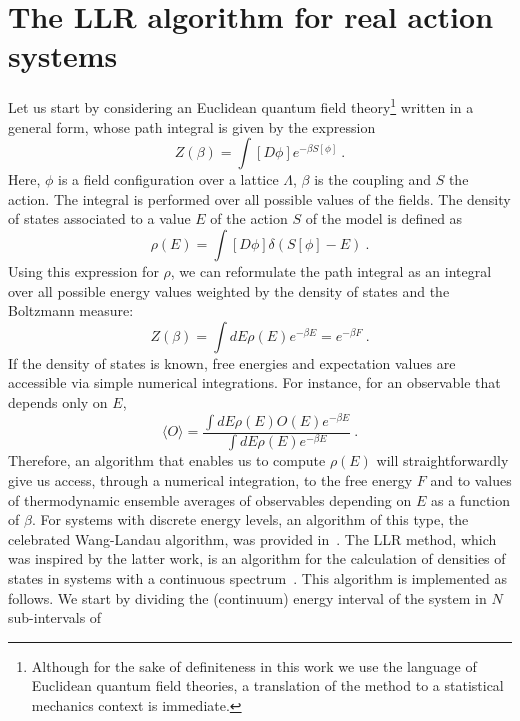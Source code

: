\documentclass[a4paper]{jpconf}
\begin{document}
\section{The LLR algorithm for real action systems}
\label{sect:real}
Let us start by considering an Euclidean quantum field
theory\footnote{Although for the sake of definiteness in this work we
  use the language of Euclidean quantum field theories, a translation
  of the method to a statistical mechanics context is immediate.} written in a general
form, whose path integral is given by the expression
\begin{equation}
Z(\beta)=\int [ D \phi ] e^{-\beta S [ \phi ]} \ .
\end{equation}
Here, $\phi$ is a field configuration over a lattice $\Lambda$,
$\beta$ is the coupling and $S$ the action. The integral is performed
over all possible values of the fields.  The density of states
associated to a value $E$ of the action $S$ of the model is defined as
\begin{equation}
\rho(E)=\int [ D \phi ] \delta(S[\phi]-E) \ .
\end{equation}
Using this expression for $\rho$, we can reformulate the path integral
as an integral over all possible energy values weighted by the density
of states and the Boltzmann measure:
\begin{equation}
Z(\beta)=\int d E \rho(E) e^{-\beta E}= e^{- \beta F} \ .
\end{equation}
If the density of states is known, free energies and expectation
values are accessible via simple numerical integrations. For instance,
for an observable that depends only on $E$, 
\begin{equation}
 \langle O \rangle=\frac{\int dE \rho(E) O(E) e^{-\beta E}}{\int dE
   \rho(E) e^{-\beta E}} \ . 
\end{equation}
Therefore, an algorithm that enables us to compute $\rho(E)$ will
straightforwardly give us access, through a numerical integration, to
the free energy $F$ and to values of thermodynamic ensemble averages of
observables depending on $E$ as a function of $\beta$. For systems
with discrete energy levels, an algorithm of this type, the celebrated
Wang-Landau algorithm, was provided
in~\cite{Wang:2000fzi}. The LLR method, which was inspired by the latter work,
is an algorithm for the calculation of densities of states in systems
with a continuous
spectrum~\cite{Langfeld:2012ah,Langfeld:2015fua}. This algorithm is
implemented as follows. We start by dividing the 
(continuum) energy interval of the system in $N$ sub-intervals of
\end{document}
